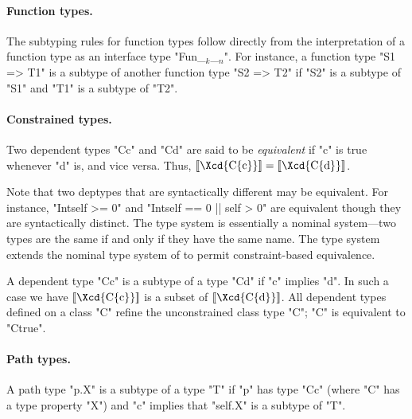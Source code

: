 \paragraph{Function types.}

The subtyping rules for function types follow directly from the
interpretation of a function type as an interface type
\xcdmath"Fun_$_k$_$_n$".
For instance,
a function type
\xcd"S1 => T1" 
is a subtype of another function type
\xcd"S2 => T2" 
if \xcd"S2" is a subtype of \xcd"S1"
and \xcd"T1" is a subtype of \xcd"T2".

\paragraph{Constrained types.}

Two dependent types \xcd"C{c}" and \xcd"C{d}" are said to be {\em equivalent} if 
\xcd"c" is true whenever \xcd"d" is, and vice versa. Thus, 
$\LL{\mbox{\Xcd{C\{c\}}}} = \LL{\mbox{\Xcd{C\{d\}}}}$.

Note that two deptypes that are syntactically different may be
equivalent. For instance, \xcd"Int{self >= 0}" and
\xcd"Int{self == 0 || self > 0}" are equivalent though they are syntactically
distinct. The \Java{} type system is essentially a nominal system---two
types are the same if and only if they have the same name. The \Xten{}
type system extends the nominal type system of \Java{} to permit
constraint-based equivalence.

A dependent type \xcd"C{c}" is a subtype of a type \xcd"C{d}" if
\xcd"c" implies \xcd"d".  In such a case we have
$\LL{\mbox{\Xcd{C\{c\}}}}$ is a
subset of $\LL{\mbox{\Xcd{C\{d\}}}}$. All dependent types
defined on a class \xcd"C"
refine the unconstrained class type \xcd"C"; \xcd"C" is
equivalent to \xcd"C{true}".

\paragraph{Path types.}

A path type \xcd"p.X" is a subtype of a type \xcd"T" if
\xcd"p" has type \xcd"C{c}" (where \xcd"C" has a type property
\xcd"X") and \xcd"c" implies that \xcd"self.X" is a subtype of \xcd"T".





